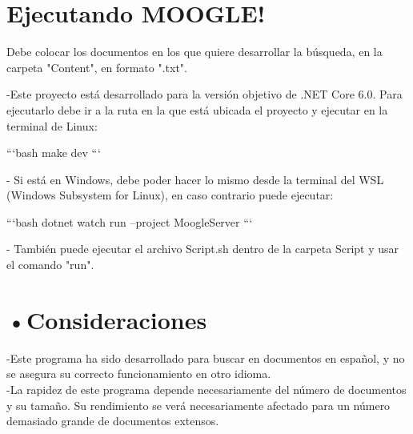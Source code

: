 \documentclass[aspectratio = 169, 14pt]{article}
\begin{document}
\begin{Large}
\section{Ejecutando MOOGLE!}
Debe colocar los documentos en los que quiere desarrollar la búsqueda, en la carpeta
"Content", en formato ".txt".  

-Este proyecto está desarrollado para la versión objetivo de .NET Core 6.0. Para ejecutarlo debe ir a la ruta en la que está ubicada el proyecto y ejecutar en la terminal de Linux:

\begin{flushleft}
```bash\newline
make dev
```

- Si está en Windows, debe poder hacer lo mismo desde la terminal del WSL (Windows Subsystem for Linux), en caso contrario puede ejecutar:

```bash\newline
dotnet watch run --project MoogleServer
```

- También puede ejecutar el archivo Script.sh dentro de la carpeta Script y usar el comando "run".

\end{flushleft}
\section{•Consideraciones}
-Este programa ha sido desarrollado para
buscar en documentos en español, y no se
asegura su correcto funcionamiento en otro
idioma.\\
\newline
-La rapidez de este programa depende
necesariamente del número de documentos y
su tamaño. Su rendimiento se
verá necesariamente afectado para un número demasiado
grande de documentos extensos.
\end{Large}
\end{document}
